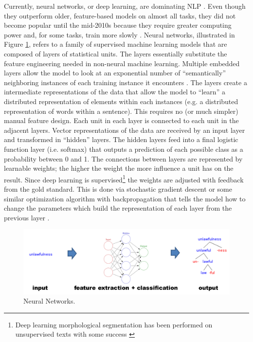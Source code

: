 Currently, neural networks, or deep learning,
are dominating NLP \citep{goldberg_neural_2017}.
Even though they outperform older, feature-based models on almost all tasks, they did not become popular until the mid-2010s because they require greater computing power and, for some tasks, train more slowly \citep{cotterell_cross-lingual_2017}. Neural networks, illustrated in Figure \ref{fig:DL}, refers to a family of supervised machine learning models that are composed of layers of statistical units. The layers essentially substitute the feature engineering needed in non-neural machine learning. Multiple embedded layers allow the model to look at an exponential number of ``semantically'' neighboring instances of each training instance it encounters \citep{bengio_neural_2003}. The layers create a intermediate representations of the data that allow the model to ``learn'' a distributed representation of elements within each instances (e.g. a distributed representation of words within a sentence). This requires no (or much simpler) manual feature design. Each unit in each layer is connected to each unit in the adjacent layers. Vector representations of the data are received by an input layer and transformed in ``hidden'' layers. The hidden layers feed into a final logistic function layer (i.e. softmax) that outputs a prediction of each possible class as a probability between 0 and 1. The connections between layers are represented by learnable weights; the higher the weight the more influence a unit has on the result. Since deep learning is supervised\footnote{Deep learning morphological segmentation has been performed on unsupervised texts with some success \citep{wang_morphological_2016}} the weights are adjusted with feedback from the gold standard. This is done via stochastic gradient descent or some similar optimization algorithm \citep{goldberg_neural_2017} with backpropagation that tells the model how to change the parameters which build the representation of each layer from the previous layer \citep{lecun_deep_2015}.

\begin{figure}[t]
\begin{center}
\includegraphics[width=0.95\columnwidth]{figs/DL.PNG}
\caption[Neural Networks]{Neural Networks.}
\label{fig:DL}
\end{center}
\end{figure}

